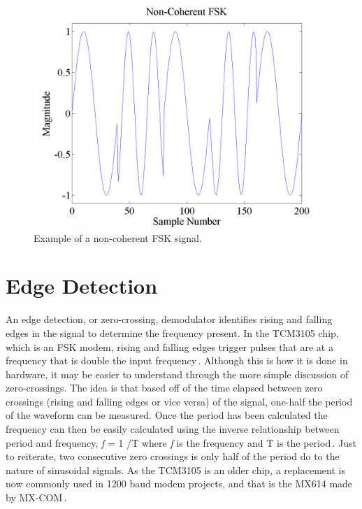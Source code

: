 \begin{figure}
  \centering
	\includegraphics[width=0.75\linewidth]{images/NonCoherentFSK.png} 
	\caption{Example of a non-coherent FSK signal.}
   \label{noncoherentFSKExample}
\end{figure}

\section{Edge Detection}
An edge detection, or zero-crossing, demodulator identifies rising and falling edges in the signal to determine the frequency present. In the TCM3105 chip, which is an FSK modem, rising and falling edges trigger pulses that are at a frequency that is double the input frequency\,\cite{Instruments1994}. Although this is how it is done in hardware, it may be easier to understand through the more simple discussion of zero-crossings. The idea is that based off of the time elapsed between zero crossings (rising and falling edges or vice versa) of the signal, one-half the period of the waveform can be measured. Once the period has been calculated the frequency can then be easily calculated using the inverse relationship between period and frequency, \textit{f} = 1 /T where \textit{f} is the frequency and T is the period\,\cite{Seguine2006}. Just to reiterate, two consecutive zero crossings is only half of the period do to the nature of sinusoidal signals. As the TCM3105 is an older chip, a replacement is now commonly used in 1200 baud modem projects, and that is the MX614 made by MX-COM\,\cite{Mitrenga2000}.

